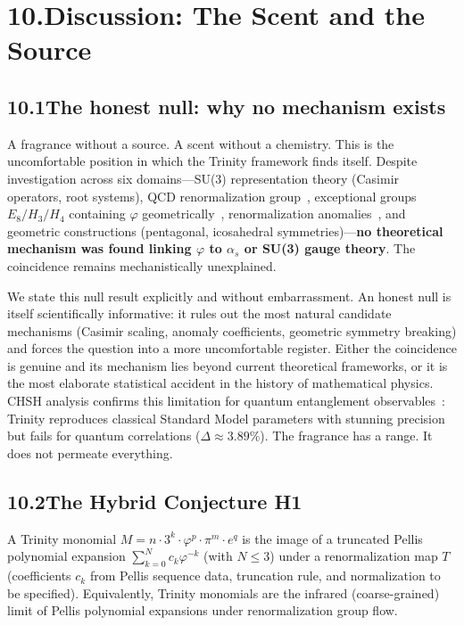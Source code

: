 \documentclass[10pt,a4paper]{article}
\begin{document}
\section*{10.\quad Discussion: The Scent and the Source}

\subsection*{10.1\quad The honest null: why no mechanism exists}

A fragrance without a source. A scent without a chemistry.
This is the uncomfortable position in which the Trinity framework finds itself.
Despite investigation across six domains---SU(3) representation theory (Casimir operators,
root systems), QCD renormalization group~\cite{GrossWilczek1973}, exceptional groups
$E_8/H_3/H_4$ containing $\varphi$ geometrically~\cite{Baez2002}, renormalization
anomalies~\cite{Adler1969}, and geometric constructions (pentagonal, icosahedral
symmetries)---\textbf{no theoretical mechanism was found linking $\varphi$ to $\alpha_s$
or SU(3) gauge theory}. The coincidence remains mechanistically unexplained.

We state this null result explicitly and without embarrassment.
An honest null is itself scientifically informative: it rules out the most natural
candidate mechanisms (Casimir scaling, anomaly coefficients, geometric symmetry breaking)
and forces the question into a more uncomfortable register.
Either the coincidence is genuine and its mechanism lies beyond current theoretical
frameworks, or it is the most elaborate statistical accident in the history of
mathematical physics. CHSH analysis confirms this limitation for quantum entanglement
observables~\cite{chsh1969}: Trinity reproduces classical Standard Model parameters
with stunning precision but fails for quantum correlations ($\Delta \approx 3.89\%$).
The fragrance has a range. It does not permeate everything.

\subsection*{10.2\quad The Hybrid Conjecture H1}

\begin{conjecture}
  A Trinity monomial $M = n \cdot 3^k \cdot \varphi^p \cdot \pi^m \cdot e^q$
  is the image of a truncated Pellis polynomial expansion
  $\sum_{k=0}^{N} c_k \varphi^{-k}$ (with $N \le 3$) under a renormalization map $T$
  (coefficients $c_k$ from Pellis sequence data, truncation rule, and normalization to be
  specified). Equivalently, Trinity monomials are the infrared (coarse-grained) limit of
  Pellis polynomial expansions under renormalization group flow.
\end{conjecture}
\end{document}
